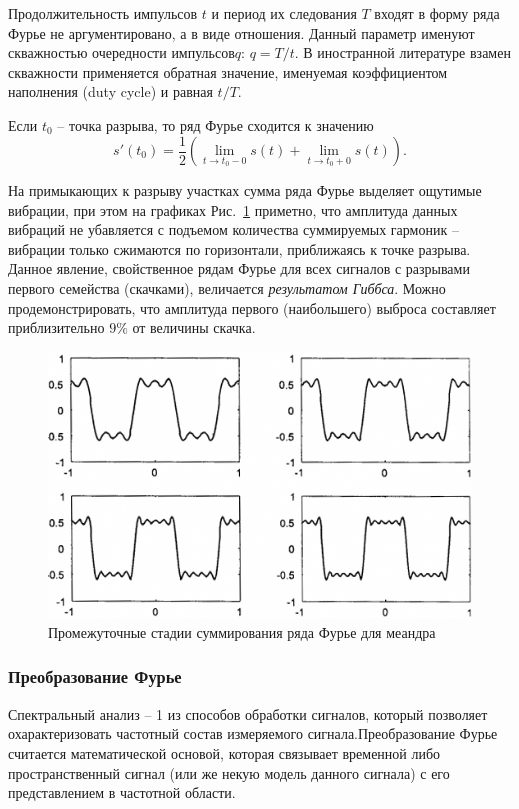 \documentclass[12pt,a4paper]{article}
\begin{document}
Продолжительность импульсов $t$ и период их следования $T$ входят в форму ряда Фурье не аргументировано, а в виде отношения. Данный параметр именуют скважностью очередности импульсов$q$: $q=T/t$. В иностранной литературе взамен скважности применяется обратная значение, именуемая коэффициентом наполнения (duty cycle) и равная $t/T$.

Если $t_0$ -- точка разрыва, то ряд Фурье сходится к значению
\begin{equation}
s'\left(t_0\right)=\frac{1}{2}\left(\lim_{t\rightarrow t_0-0}{s\left(t\right)}+\lim_{t\rightarrow t_0+0}{s\left(t\right)}\right).
\end{equation}

На примыкающих к разрыву участках сумма ряда Фурье выделяет ощутимые вибрации, при этом на графиках Рис.~\ref{img:gibbs} приметно, что амплитуда данных вибраций не убавляется с подъемом количества суммируемых гармоник -- вибрации только сжимаются по горизонтали, приближаясь к точке разрыва. Данное явление, свойственное рядам Фурье для всех сигналов с разрывами первого семейства (скачками), величается \emph{результатом Гиббса}. Можно продемонстрировать, что амплитуда первого (наибольшего) выброса составляет приблизительно $9\%$ от величины скачка.
\begin{figure}[H]
\includegraphics[scale=1]{gibbs}
\caption{Промежуточные стадии суммирования ряда Фурье для меандра}
\label{img:gibbs}
\end{figure}

\subsubsection{Преобразование Фурье}

Спектральный анализ -- 1 из способов обработки сигналов, который позволяет охарактеризовать частотный состав измеряемого сигнала.\linebreak Преобразование Фурье считается математической основой, которая связывает временной либо пространственный сигнал (или же некую модель данного сигнала) с его представлением в частотной области.
\end{document}
